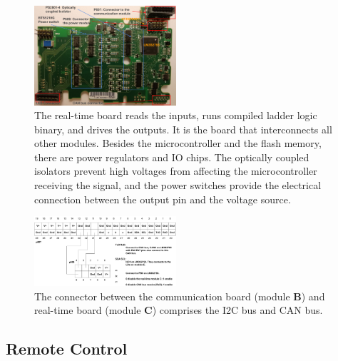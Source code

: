 \begin{figure}[th]
	\includegraphics[width=0.47\textwidth]{figures/board2}
	\centering
	\caption{The real-time board reads the inputs, runs compiled ladder logic binary, and drives the outputs. It is the board that interconnects all other modules. Besides the microcontroller and the flash memory, there are power regulators and IO chips. The optically coupled isolators prevent high voltages from affecting the microcontroller receiving the signal, and the power switches provide the electrical connection between the output pin and the voltage source.}
	\label{fig:board}
\end{figure}


\begin{figure}[th]
	\includegraphics[width=0.47\textwidth]{figures/p607_2}
	\centering
	\caption{The connector between the communication board (module \textbf{B}) and real-time board (module \textbf{C}) comprises the I2C bus and CAN bus. }
	\label{fig:p607}
\end{figure}

%
%
%
%


\subsection{Remote Control}

